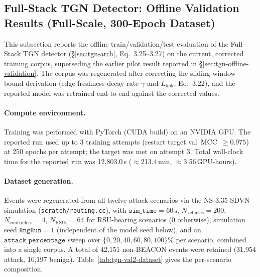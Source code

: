 \subsection{Full-Stack TGN Detector: Offline Validation Results (Full-Scale, 300-Epoch Dataset)}
\label{sec:tgn-offline-validation-v2}

This subsection reports the offline train/validation/test evaluation of the
Full-Stack TGN detector (\S\ref{sec:tgn-arch}, Eq.~3.25--3.27) on the
current, corrected training corpus, superseding the earlier pilot result
reported in \S\ref{sec:tgn-offline-validation}. The corpus was regenerated
after correcting the sliding-window bound derivation (edge-freshness decay
rate $\gamma$ and $L_{\text{link}}$, Eq.~3.22), and the reported model was
retrained end-to-end against the corrected values.

\paragraph{Compute environment.}
Training was performed with PyTorch (CUDA build) on an NVIDIA GPU. The
reported run used up to 3 training attempts (restart target val~MCC~$\geq
0.975$) at 250 epochs per attempt; the target was met on attempt 3. Total
wall-clock time for the reported run was 12{,}803.0\,s ($\approx$213.4\,min,
$\approx$3.56\,GPU-hours).

\paragraph{Dataset generation.}
Events were regenerated from all twelve attack scenarios via the NS-3.35
SDVN simulation (\texttt{scratch/routing.cc}), with
$\texttt{sim\_time}=60\,\text{s}$, $N_{\text{vehicles}}=200$,
$N_{\text{controllers}}=4$, $N_{\text{RSUs}}=64$ for RSU-bearing scenarios
(0 otherwise), simulation seed $\texttt{RngRun}=1$ (independent of the
model seed below), and an $\texttt{attack\_percentage}$ sweep over
$\{0, 20, 40, 60, 80, 100\}\%$ per scenario, combined into a single corpus.
A total of 42{,}151 non-BEACON events were retained (31{,}954 attack,
10{,}197 benign). Table~\ref{tab:tgn-val2-dataset} gives the per-scenario
composition.

